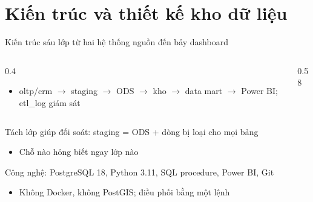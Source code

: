 \section[Kiến trúc và thiết kế]{Kiến trúc và thiết kế kho dữ liệu}

\begin{frame}{Kiến trúc sáu lớp từ hai hệ thống nguồn đến bảy dashboard}
\begin{columns}[T]\begin{column}{0.4\textwidth}
\begin{itemize}
  \item oltp/crm $\rightarrow$ staging $\rightarrow$ ODS $\rightarrow$ kho $\rightarrow$ data mart $\rightarrow$ Power BI; etl\_log giám sát
\end{itemize}
\end{column}\begin{column}{0.58\textwidth}
\begin{center}\end{center}
\end{column}\end{columns}

\end{frame}

\begin{frame}{Tách lớp giúp đối soát: staging = ODS + dòng bị loại cho mọi bảng}
\begin{itemize}
  \item Chỗ nào hỏng biết ngay lớp nào
\end{itemize}

\end{frame}

\begin{frame}{Công nghệ: PostgreSQL 18, Python 3.11, SQL procedure, Power BI, Git}
\begin{itemize}
  \item Không Docker, không PostGIS; điều phối bằng một lệnh
\end{itemize}

\end{frame}

